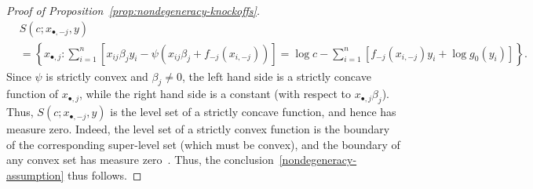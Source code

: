 \documentclass[12pt]{article}
\theoremstyle{definition}
\theoremstyle{remark}
\newcommand{\srx}{X}
\newcommand{\sfx}{x}
\newcommand{\srxk}{\widetilde X}
\newcommand{\sry}{Y}
\newcommand{\sfy}{y}
\begin{document}
\begin{proof}[Proof of Proposition~\ref{prop:nondegeneracy-knockoffs}]
\begin{equation}
	\begin{split}
	&S(c; \sfx_{\bullet,-j}, \sfy) \\
	&= \left\{x_{\bullet,j}: \sum_{i = 1}^n [\sfx_{ij}\beta_j \sfy_i  - \psi(\sfx_{ij} \beta_j + f_{-j}(\sfx_{i,-j}))] =  \log c- \sum_{i = 1}^n [f_{-j}(\sfx_{i,-j})\sfy_i  + \log g_0(\sfy_i)]\right\}. 
	\end{split}
	\label{likelihood-expression}
	\end{equation}
	Since $\psi$ is strictly convex and $\beta_j \neq 0$, the left hand side is a strictly concave function of $x_{\bullet,j}$, while the right hand side is a constant (with respect to $x_{\bullet,j}\beta_j$). Thus, $S(c; \sfx_{\bullet,-j}, \sfy)$ 
	is the level set of a strictly concave function, and hence has measure zero. Indeed, the level set of a strictly convex function is the boundary of the corresponding super-level set (which must be convex), and the boundary of any convex set has measure zero~\cite{Lang1986}. Thus, the  conclusion~\eqref{nondegeneracy-assumption} thus follows.
	
	

\end{proof}
\end{document}
